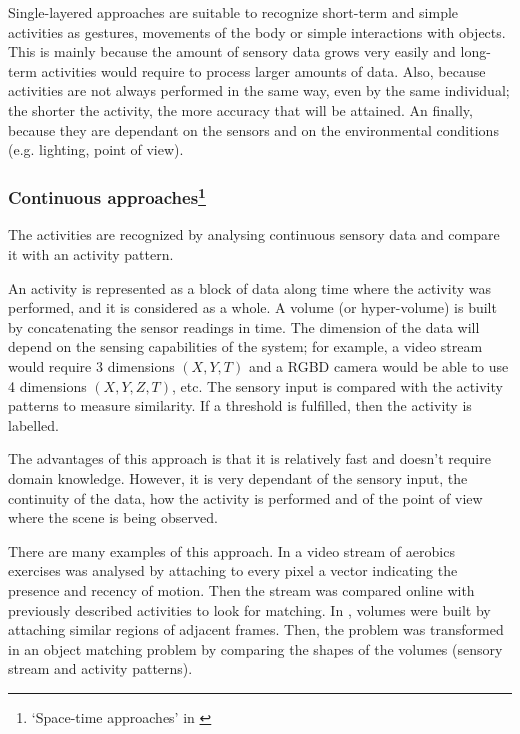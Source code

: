 \documentclass[a4paper, 12pt, openany, oneside]{book}
\begin{document}

Single-layered approaches are suitable to recognize short-term and simple activities as gestures, movements of the body or simple interactions with objects. 
This is mainly because the amount of sensory data grows very easily and long-term activities would require to process larger amounts of data. 
Also, because activities are not always performed in the same way, even by the same individual; the shorter the activity, the more accuracy that will be attained.
An finally, because they are dependant on the sensors and on the environmental conditions (e.g. lighting, point of view).


\subsubsection{Continuous approaches\footnote{`Space-time approaches' in \citep{Aggarwal11_HumanActivity}}} %

The activities are recognized by analysing continuous sensory data and compare it with an activity pattern.

An activity is represented as a block of data along time where the activity was performed, and it is considered as a whole.
A volume (or hyper-volume) is built by concatenating the sensor readings in time.
The dimension of the data will depend on the sensing capabilities of the system; for example, a video stream would require 3 dimensions $(X,Y,T)$ and a RGBD camera would be able to use 4 dimensions $(X,Y,Z,T)$, etc. %
The sensory input is compared with the activity patterns to measure similarity.
If a threshold is fulfilled, then the activity is labelled.

The advantages of this approach is that it is relatively fast and doesn't require domain knowledge. 
However, it is very dependant of the sensory input, the continuity of the data, how the activity is performed and of the point of view where the scene is being observed. %

There are many examples of this approach.
In \citep{Bobick2001_RecHuMovTemp} a video stream of aerobics exercises was analysed by attaching to every pixel a vector indicating the presence and recency of motion. 
Then the stream was compared online with previously described activities to look for matching. 
In \citep{Ke2007_SpTmpShapeAR}, volumes were built by attaching similar regions of adjacent frames.
Then, the problem was transformed in an object matching problem by comparing the shapes of the volumes (sensory stream and activity patterns).
\end{document}
